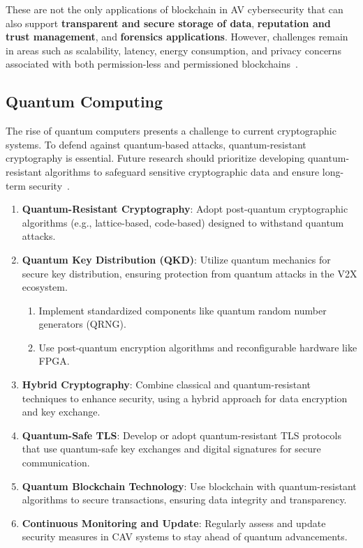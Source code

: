 These are not the only applications of blockchain in AV cybersecurity that can also support \textbf{transparent and secure storage of data},
\textbf{reputation and trust management}, and \textbf{forensics applications}.
However, challenges remain in areas such as scalability, latency, energy consumption,
and privacy concerns associated with both permission-less and permissioned blockchains~\cite{bendiab2023autonomous, giannaros2023autonomous, khan2020cyber, admass2023cyber, ahmad2023machine}.

\subsection{Quantum Computing}\label{subsec:quantum-computing}
The rise of quantum computers presents a challenge to current cryptographic systems.
To defend against quantum-based attacks, quantum-resistant cryptography is essential.
Future research should prioritize
developing quantum-resistant algorithms to safeguard sensitive cryptographic data and ensure long-term security~\cite{ahmad2023machine, admass2023cyber}.

\begin{enumerate}
    \item \textbf{Quantum-Resistant Cryptography}:
    Adopt post-quantum cryptographic algorithms (e.g., lattice-based, code-based) designed to withstand quantum attacks.
    \item \textbf{Quantum Key Distribution (QKD)}: Utilize quantum mechanics for secure key distribution,
    ensuring protection from quantum attacks in the V2X ecosystem.
    \begin{enumerate}
        \item Implement standardized components like quantum random number generators (QRNG).
        \item Use post-quantum encryption algorithms and reconfigurable hardware like FPGA.
    \end{enumerate}
    \item \textbf{Hybrid Cryptography}: Combine classical and quantum-resistant techniques to enhance security,
    using a hybrid approach for data encryption and key exchange.
    \item \textbf{Quantum-Safe TLS}:
    Develop or adopt quantum-resistant TLS protocols
    that use quantum-safe key exchanges and digital signatures for secure communication.
    \item \textbf{Quantum Blockchain Technology}: Use blockchain with quantum-resistant algorithms to secure transactions,
    ensuring data integrity and transparency.
    \item \textbf{Continuous Monitoring and Update}:
    Regularly assess and update security measures in CAV systems to stay ahead of quantum advancements.
\end{enumerate}

